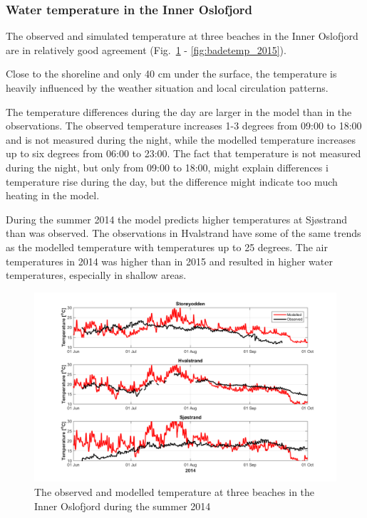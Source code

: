 \clearpage
\subsubsection{Water temperature in the Inner Oslofjord}

The observed and simulated temperature at three beaches in the Inner Oslofjord are in relatively good agreement (Fig.~\ref{fig:badetemp_2014} - \ref{fig:badetemp_2015}). 

Close to the shoreline and only 40 cm under the surface, the temperature is heavily influenced by the weather situation and local circulation patterns. 

The temperature differences during the day are larger in the model than in the observations. The observed temperature increases 1-3 degrees from 09:00 to 18:00 and is not measured during the night, while the modelled temperature increases up to six degrees from 06:00 to 23:00. The fact that temperature is not measured during the night, but only from 09:00 to 18:00, might explain differences i temperature rise during the day, but the difference might indicate too much heating in the model.


During the summer 2014 the model predicts higher temperatures at Sj\o strand than was observed. The observations in Hvalstrand have some of the same trends as the modelled temperature with temperatures up to 25 degrees. The air temperatures in 2014 was higher than in 2015 and resulted in higher water temperatures, especially in shallow areas. 

\begin{figure}[ht]
\centerline{
\includegraphics*[trim=0 0 0 0,clip=true,width=\textwidth]{Figurer/badetemp_2014}
}
\caption{\small
The observed and modelled temperature at three beaches in the Inner Oslofjord during the summer 2014}
\label{fig:badetemp_2014}
\end{figure}

